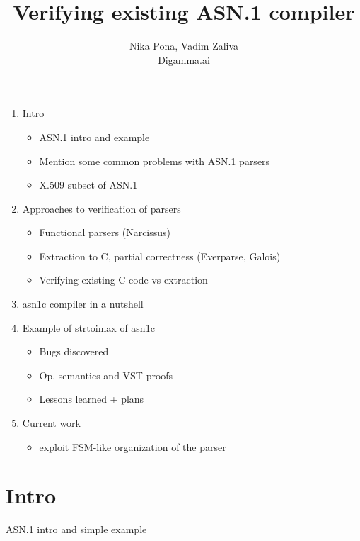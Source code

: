 \documentclass{article}
\begin{document}
\title{Verifying existing ASN.1 compiler}

\author{Nika Pona, Vadim Zaliva \\
        Digamma.ai}

\maketitle

\begin{abstract}

\end{abstract}
\begin{enumerate}

\item Intro
  \begin{itemize}
  \item ASN.1 intro and example 
  \item Mention some common problems with ASN.1 parsers
    \item X.509 subset of ASN.1
  \end{itemize}
\item Approaches to verification of parsers
  \begin{itemize}
  \item Functional parsers (Narcissus)
  \item Extraction to C, partial correctness (Everparse, Galois)
   \item Verifying existing C code vs extraction
  \end{itemize}
  \item asn1c compiler in a nutshell
  \item Example of strtoimax of asn1c
\begin{itemize}
\item Bugs discovered
  \item Op. semantics and VST proofs
  \item Lessons learned + plans
  \end{itemize}
\item Current work
  \begin{itemize}
  \item exploit FSM-like organization of the parser
    \end{itemize}

\end{enumerate}

\section{Intro}
 ASN.1 intro and simple example 
\end{document}
